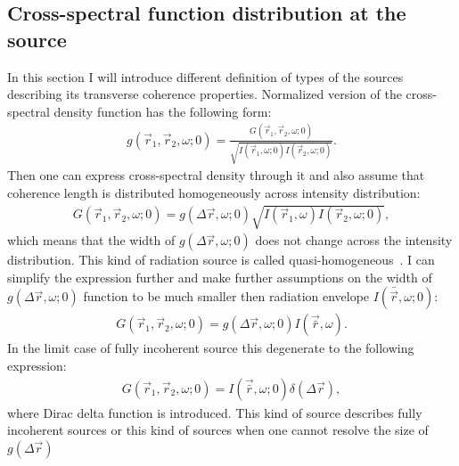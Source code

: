 \subsection{Cross-spectral function distribution at the source}
    In this section I will introduce different definition of  types of the sources describing its transverse coherence properties. Normalized version of the cross-spectral density function has the following form:
    \begin{align}
        g(\vec{r}_1, \vec{r}_2, \omega; 0) = \frac{G(\vec{r}_1, \vec{r}_2, \omega; 0)}{\sqrt{I(\vec{r}_1, \omega; 0)I(\vec{r}_2, \omega; 0)}}.
    \end{align}
    Then one can express cross-spectral density through it and also assume that coherence length is distributed homogeneously across intensity distribution:
    \begin{align}
        G(\vec{r}_1, \vec{r}_2, \omega; 0) =  g(\Delta \vec{r}, \omega; 0){\sqrt{I(\vec{r}_1, \omega)I(\vec{r}_2, \omega; 0)}},
    \end{align}
    which means that the width of $g(\Delta \vec{r}, \omega; 0)$ does not change across the intensity distribution. This kind of radiation source is called quasi-homogeneous~\cite{goodman_statistical_2015}. I can simplify the expression further and make further assumptions on the width of $g(\Delta \vec{r}, \omega; 0)$ function to be much smaller then radiation envelope $I(\bar{\vec{r}}, \omega; 0)$:
    \begin{align}
        G(\vec{r}_1, \vec{r}_2, \omega; 0) =  g(\Delta \vec{r}, \omega; 0)I(\vec{\bar{r}}, \omega).
        \label{Eq:quasi_homogeneous_source_weak}
    \end{align}
    In the limit case of fully incoherent source this degenerate to the following expression:
    \begin{align}
        G(\vec{r}_1, \vec{r}_2, \omega; 0) =  I(\vec{\bar{r}}, \omega; 0)\delta(\Delta \vec{r}),
        \label{Eq:incoherent_source}        
    \end{align}
    where Dirac delta function is introduced. This kind of source describes fully incoherent sources or this kind of sources when one cannot resolve the size of $g(\Delta \vec{r})$
    
